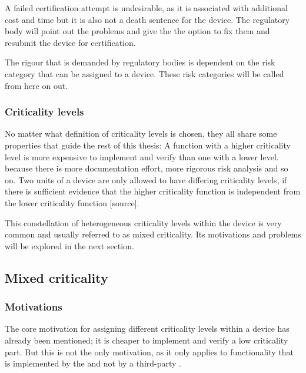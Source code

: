 A failed certification attempt is undesirable, as it is associated with additional cost and time but it is also not a death sentence for the device. The regulatory body will point out the problems and give the \mfg{} the option to fix them and resubmit the device for certification.

The rigour that is demanded by regulatory bodies is dependent on the risk category that can be assigned to a device. These risk categories will be called  from here on out. 

\subsubsection{Criticality levels}

No matter what definition of criticality levels is chosen, they all share some properties that guide the rest of this thesis: A function with a higher criticality level is more expensive to implement and verify than one with a lower level. because there is more documentation effort, more rigorous risk analysis and so on. Two units of a device are only allowed to have differing criticality levels, if there is sufficient evidence that the higher criticality function is independent from the lower criticality function [source]. 

This constellation of heterogeneous criticality levels within the device is very common and usually referred to as mixed criticality. Its motivations and problems will be explored in the next section.
\subsection{Mixed criticality}
\subsubsection{Motivations}
The core motivation for assigning different criticality levels within a device has already been mentioned; it is cheaper to implement and verify a low criticality part. But this is not the only motivation, as it only applies to functionality that is implemented by the \mfg{} and not by a third-party .

